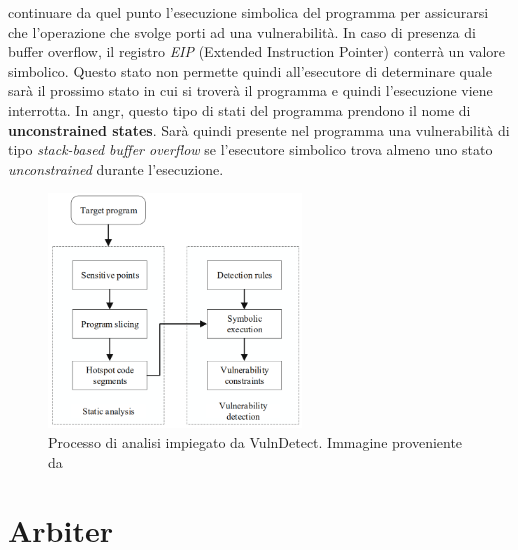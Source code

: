 \documentclass[../main.tex]{subfiles}
\begin{document}
\begin{enumerate}
    continuare da quel punto l'esecuzione simbolica del programma per assicurarsi che l'operazione che svolge porti ad una vulnerabilità. In caso di presenza di buffer overflow, il registro \textit{EIP} (Extended Instruction Pointer) conterrà un valore simbolico. Questo stato non permette quindi all'esecutore di determinare quale sarà il prossimo
    stato in cui si troverà il programma e quindi l'esecuzione viene interrotta. In angr, questo tipo di stati del programma prendono il nome di \textbf{unconstrained states}. 
    Sarà quindi presente nel programma una vulnerabilità di tipo \textit{stack-based buffer overflow} se l'esecutore simbolico trova almeno uno stato \textit{unconstrained} durante l'esecuzione.
\end{enumerate}
\begin{figure}[H]
    \centering
    \includegraphics[width = 0.60\textwidth]{../images/VulnDetect.png}
    \caption{Processo di analisi impiegato da VulnDetect. Immagine proveniente da \cite{VulnDetect}}
\end{figure}
\section{Arbiter}
\end{document}

